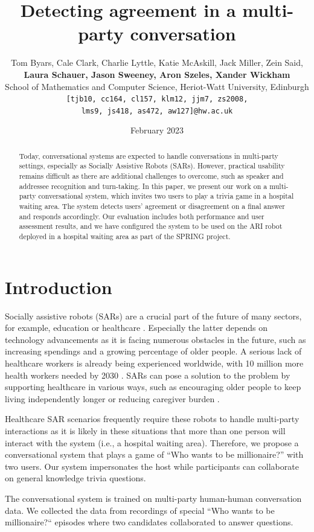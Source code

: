 \documentclass[hidelinks, 11pt]{article}
\title{Detecting agreement in a multi-party conversation}
\author{Tom Byars, Cale Clark, Charlie Lyttle, Katie McAskill, Jack Miller, Zein Said, \\
{\bf Laura Schauer, Jason Sweeney, Aron Szeles, Xander Wickham} \\
School of Mathematics and Computer Science, Heriot-Watt University, Edinburgh \\ {\tt {[tjb10, cc164, cl157, klm12, jjm7, zs2008,}} \\ {\tt {lms9, js418, as472, aw127]}@hw.ac.uk}}
\date{February 2023}
\begin{document}
\maketitle

\begin{abstract}
  Today, conversational systems are expected to handle conversations in multi-party settings, especially as Socially Assistive Robots (SARs). However, practical usability remains difficult as there are additional challenges to overcome, such as speaker and addressee recognition and turn-taking. In this paper, we present our work on a multi-party conversational system, which invites two users to play a trivia game in a hospital waiting area. The system detects users' agreement or disagreement on a final answer and responds accordingly. Our evaluation includes both performance and user assessment results, and we have configured the system to be used on the ARI robot deployed in a hospital waiting area as part of the SPRING project.
\end{abstract}


\section{Introduction}
\label{sec:introduction}

Socially assistive robots (SARs) are a crucial part of the future of many sectors, for example, education or healthcare \cite{gunson_visually_aware_2022}. Especially the latter depends on technology advancements as it is facing numerous obstacles in the future, such as increasing spendings and a growing percentage of older people. A serious lack of healthcare workers is already being experienced worldwide, with 10 million more health workers needed by 2030 \cite{cooper_ari_2020,Health_workforce_2023}. SARs can pose a solution to the problem by supporting healthcare in various ways, such as encouraging older people to keep living independently longer or reducing caregiver burden \cite{cooper_ari_2020}.

Healthcare SAR scenarios frequently require these robots to handle multi-party interactions as it is likely in these situations that more than one person will interact with the system (i.e., a hospital waiting area). Therefore, we propose a conversational system that plays a game of ``Who wants to be millionaire?'' with two users. Our system impersonates the host while participants can collaborate on general knowledge trivia questions.

The conversational system is trained on multi-party human-human conversation data. We collected the data from recordings of special “Who wants to be millionaire?“ episodes where two candidates collaborated to answer questions.
\end{document}

